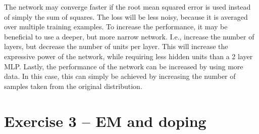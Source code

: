 \documentclass[a4paper]{article}
\begin{document}
\begin{enumerate}
The network may converge faster if the root mean squared error is used instead of simply the sum of squares. The loss will be less noisy, because it is averaged over multiple training examples. To increase the performance, it may be beneficial to use a deeper, but more narrow network. I.e., increase the number of layers, but decrease the number of units per layer. This will increase the expressive power of the network, while requiring less hidden units than a 2 layer MLP. Lastly, the performance of the network can be increased by using more data. In this case, this can simply be achieved by increasing the number of samples taken from the original distribution.
\end{enumerate}


\pagebreak
\section*{Exercise 3 -- EM and doping} %
\end{document}
